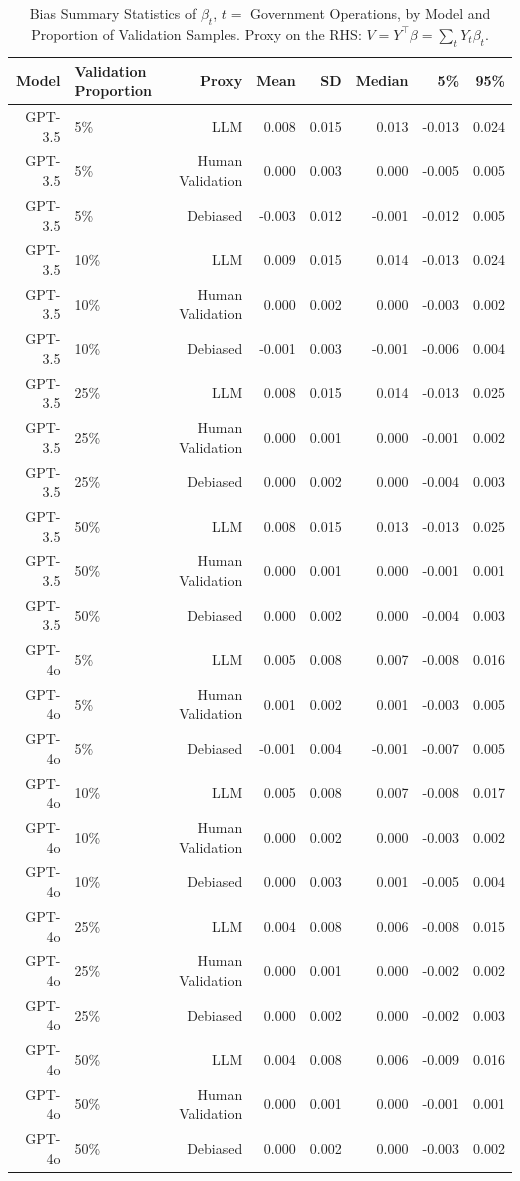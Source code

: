 \begin{table}

\caption{Bias Summary Statistics of $\beta_{t}$, $t=$ Government Operations, by Model and Proportion of Validation Samples.
      Proxy on the RHS: $V = Y^\top \beta = \sum_{t} Y_t \beta_t$.}
\centering
\begin{tabular}[t]{rlrrrrrr}
\toprule
Model & Validation Proportion & Proxy & Mean & SD & Median & 5\% & 95\%\\
\midrule
GPT-3.5 & 5\% & LLM & 0.008 & 0.015 & 0.013 & -0.013 & 0.024\\
GPT-3.5 & 5\% & Human Validation & 0.000 & 0.003 & 0.000 & -0.005 & 0.005\\
GPT-3.5 & 5\% & Debiased & -0.003 & 0.012 & -0.001 & -0.012 & 0.005\\
GPT-3.5 & 10\% & LLM & 0.009 & 0.015 & 0.014 & -0.013 & 0.024\\
GPT-3.5 & 10\% & Human Validation & 0.000 & 0.002 & 0.000 & -0.003 & 0.002\\
GPT-3.5 & 10\% & Debiased & -0.001 & 0.003 & -0.001 & -0.006 & 0.004\\
GPT-3.5 & 25\% & LLM & 0.008 & 0.015 & 0.014 & -0.013 & 0.025\\
GPT-3.5 & 25\% & Human Validation & 0.000 & 0.001 & 0.000 & -0.001 & 0.002\\
GPT-3.5 & 25\% & Debiased & 0.000 & 0.002 & 0.000 & -0.004 & 0.003\\
GPT-3.5 & 50\% & LLM & 0.008 & 0.015 & 0.013 & -0.013 & 0.025\\
GPT-3.5 & 50\% & Human Validation & 0.000 & 0.001 & 0.000 & -0.001 & 0.001\\
GPT-3.5 & 50\% & Debiased & 0.000 & 0.002 & 0.000 & -0.004 & 0.003\\
GPT-4o & 5\% & LLM & 0.005 & 0.008 & 0.007 & -0.008 & 0.016\\
GPT-4o & 5\% & Human Validation & 0.001 & 0.002 & 0.001 & -0.003 & 0.005\\
GPT-4o & 5\% & Debiased & -0.001 & 0.004 & -0.001 & -0.007 & 0.005\\
GPT-4o & 10\% & LLM & 0.005 & 0.008 & 0.007 & -0.008 & 0.017\\
GPT-4o & 10\% & Human Validation & 0.000 & 0.002 & 0.000 & -0.003 & 0.002\\
GPT-4o & 10\% & Debiased & 0.000 & 0.003 & 0.001 & -0.005 & 0.004\\
GPT-4o & 25\% & LLM & 0.004 & 0.008 & 0.006 & -0.008 & 0.015\\
GPT-4o & 25\% & Human Validation & 0.000 & 0.001 & 0.000 & -0.002 & 0.002\\
GPT-4o & 25\% & Debiased & 0.000 & 0.002 & 0.000 & -0.002 & 0.003\\
GPT-4o & 50\% & LLM & 0.004 & 0.008 & 0.006 & -0.009 & 0.016\\
GPT-4o & 50\% & Human Validation & 0.000 & 0.001 & 0.000 & -0.001 & 0.001\\
GPT-4o & 50\% & Debiased & 0.000 & 0.002 & 0.000 & -0.003 & 0.002\\
\bottomrule
\end{tabular}
\end{table}
